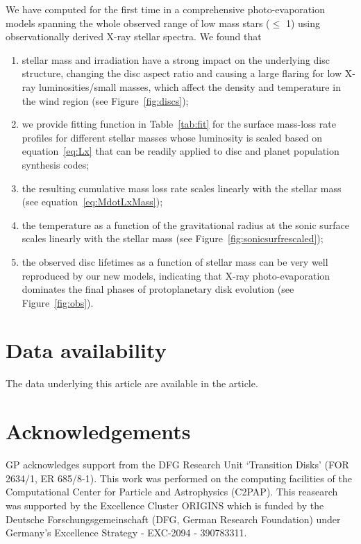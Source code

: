 \documentclass[usenatbib,useAMS,usedcolumn]{mnras}
\begin{document}
  We have computed for the first time in a comprehensive photo-evaporation models spanning the whole observed range of low mass stars ($\leq$ \SI{1}{\solarmass}) using observationally derived X-ray stellar spectra. 
  We found that

   \begin{enumerate}
      \item stellar mass and irradiation have a strong impact on the underlying disc structure, changing the disc aspect ratio and causing a large flaring for low X-ray luminosities/small masses, which affect the density and temperature in the wind region (see Figure~\ref{fig:discs});
      \item we provide fitting function in Table~\ref{tab:fit} for the surface mass-loss rate profiles for different stellar masses whose luminosity is scaled based on equation~\ref{eq:Lx} that can be readily applied to disc and planet population synthesis codes;
      \item the resulting cumulative mass loss rate scales linearly with the stellar mass (see equation~\ref{eq:MdotLxMass});
      \item the temperature as a function of the gravitational radius at the sonic surface scales linearly with the stellar mass (see Figure~\ref{fig:sonicsurfrescaled});
      \item the observed disc lifetimes as a function of stellar mass can be very well reproduced by our new models, indicating that X-ray photo-evaporation dominates the final phases of protoplanetary disk evolution (see Figure~\ref{fig:obs}).
   \end{enumerate}

\section{Data availability}
   The data underlying this article are available in the article.

\section*{Acknowledgements}

    GP acknowledges support from the DFG Research Unit ‘Transition Disks’ (FOR 2634/1, ER 685/8-1).
    This work was performed on the computing facilities of the Computational Center for Particle and Astrophysics (C2PAP).
    This reasearch was supported by the Excellence Cluster ORIGINS which is funded by the Deutsche Forschungsgemeinschaft (DFG, German Research Foundation) under Germany's Excellence Strategy - EXC-2094 - 390783311.
\end{document}
